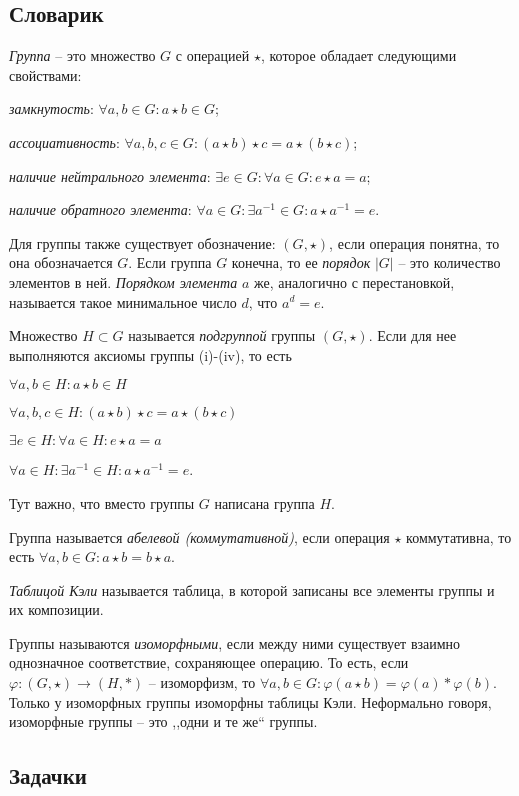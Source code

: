 \documentclass[10pt]{article}
\begin{document}
\subsection*{Словарик}
\begin{bullets}
    \item \emph{Группа} -- это множество $G$ с операцией $\star$, которое обладает следующими свойствами: 
    \begin{conditions}
        \item \textit{замкнутость}: $\forall a, b \in G: a \star b \in G$;
        \item \textit{ассоциативность}: $\forall a, b, c \in G: (a \star b) \star c = a \star (b \star c)$;
        \item \textit{наличие нейтрального элемента}: $\exists e \in G: \forall a \in G: e \star a = a$;
        \item \textit{наличие обратного элемента}: $\forall a \in G: \exists a^{-1} \in G: a \star a^{-1} = e$.
    \end{conditions}

\item Для группы также существует обозначение: $(G, \star)$, если операция понятна, то она обозначается $G$.
Если группа $G$ конечна, то ее \emph{порядок} $|G|$ -- это количество элементов в ней.
\emph{Порядком элемента} $a$ же, аналогично с перестановкой, называется такое минимальное число $d$, что $a^d = e$.

\item Множество $H \subset G$ называется \emph{подгруппой} группы $(G, \star)$. Если для нее выполняются аксиомы группы (i)-(iv), то есть \begin{inumerate}[(i)]
        \item $\forall a, b \in H: a \star b \in H$
        \item $\forall a, b, c \in H: (a \star b) \star c = a \star (b \star c)$
        \item $\exists e \in H: \forall a \in H: e \star a = a$
        \item $\forall a \in H: \exists a^{-1} \in H: a \star a^{-1} = e$. 
\end{inumerate}
Тут важно, что вместо группы $G$ написана группа $H$.

\item Группа называется \emph{абелевой (коммутативной)}, если операция $\star$ коммутативна, то есть $\forall a, b \in G: a \star b = b \star a$.

\item \emph{Таблицой Кэли} называется таблица, в которой записаны все элементы группы и их композиции. 

\item Группы называются \emph{изоморфными}, если между ними существует взаимно однозначное соответствие, сохраняющее операцию. То есть, если $\varphi: (G, \star) \to (H, *)$ -- изоморфизм, то $\forall a, b \in G: \varphi(a \star b) = \varphi(a) * \varphi(b)$. Только у изоморфных группы изоморфны таблицы Кэли. Неформально говоря, изоморфные группы -- это ,,одни и те же`` группы.
\end{bullets}
\subsection*{Задачки}

\end{document}
